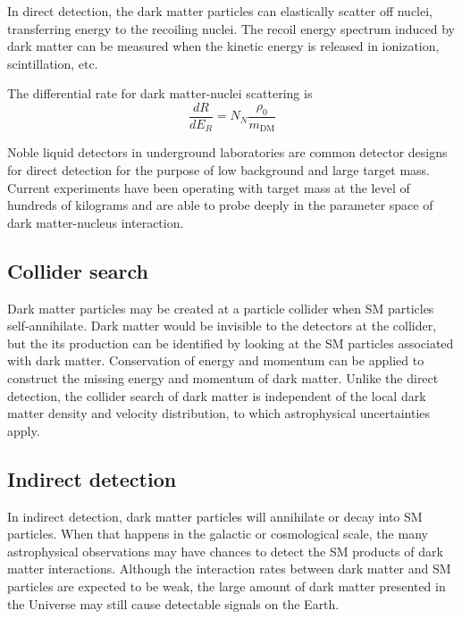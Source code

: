\documentclass[doublespace,nopageskip]{VTthesis} %
\begin{document}
In direct detection, the dark matter particles can elastically scatter off nuclei, transferring energy to the recoiling nuclei. The recoil energy spectrum induced by dark matter can be measured when the kinetic energy is released in ionization, scintillation, etc. 

The differential rate for dark matter-nuclei scattering is
\begin{equation}
    \frac{dR}{dE_R} = N_N\frac{\rho_0}{m_\mathrm{DM}}
\end{equation}

Noble liquid detectors in underground laboratories are common detector designs for direct detection for the purpose of low background and large target mass. Current experiments have been operating with target mass at the level of hundreds of kilograms and are able to probe deeply in the parameter space of dark matter-nucleus interaction.

\subsection{Collider search}

Dark matter particles may be created at a particle collider when SM particles self-annihilate. Dark matter would be invisible to the detectors at the collider, but the its production can be identified by looking at the SM particles associated with dark matter. Conservation of energy and momentum can be applied to construct the missing energy and momentum of dark matter. Unlike the direct detection, the collider search of dark matter is independent of the local dark matter density and velocity distribution, to which astrophysical uncertainties apply.

\subsection{Indirect detection}\label{sse:indirect}

In indirect detection, dark matter particles will annihilate or decay into SM particles. When that happens in the galactic or cosmological scale, the many astrophysical observations may have chances to detect the SM products of dark matter interactions. Although the interaction rates between dark matter and SM particles are expected to be weak, the large amount of dark matter presented in the Universe may still cause detectable signals on the Earth.
\end{document}

